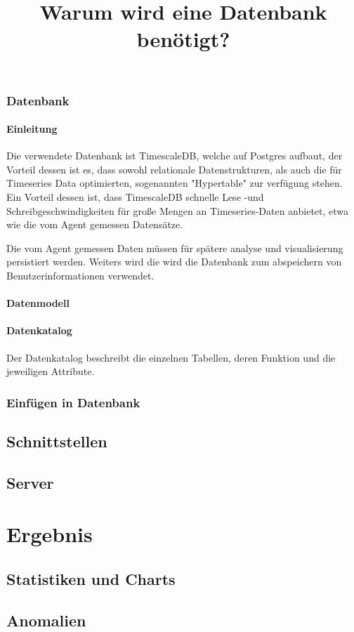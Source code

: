 \documentclass{report}
\begin{document}
\subsection{Datenbank}
\subsubsection{Einleitung}
Die verwendete Datenbank ist TimescaleDB, welche auf Postgres aufbaut, der Vorteil dessen ist es, dass sowohl relationale Datenstrukturen, als auch die für Timeseries Data optimierten, sogenannten "Hypertable" zur verfügung stehen. Ein Vorteil dessen ist, dass TimescaleDB schnelle Lese -und Schreibgeschwindigkeiten für große Mengen an Timeseries-Daten anbietet, etwa wie die vom Agent gemessen Datensätze.

\title{Warum wird eine Datenbank benötigt?}
Die vom Agent gemessen Daten müssen für spätere analyse und visualisierung persistiert werden. Weiters wird die wird die Datenbank zum abspeichern von Benutzerinformationen verwendet.

\subsubsection{Datenmodell}
\subsubsection{Datenkatalog}
Der Datenkatalog beschreibt die einzelnen Tabellen, deren Funktion und die jeweiligen Attribute.
\subsection{Einfügen in Datenbank}
\section{Schnittstellen}
\section{Server}


\chapter{Ergebnis}
\section{Statistiken und Charts}
\section{Anomalien}
\end{document}
